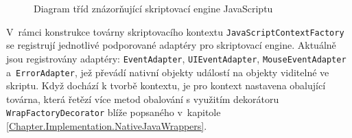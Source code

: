 \begin{figure}[H]
  \begin{center}
    \caption{Diagram tříd znázorňující skriptovací engine JavaScriptu}
    \label{Figure.WindowJavaScriptEngine}
  \end{center}
\end{figure}

\vspace{-1em}

V~rámci konstrukce továrny skriptovacího kontextu \texttt{JavaScriptContextFactory} se registrují jednotlivé podporované adaptéry pro skriptovací engine. Aktuálně jsou registrovány adaptéry: \texttt{EventAdapter}, \texttt{UIEventAdapter}, \texttt{MouseEventAdapter} a~\texttt{ErrorAdapter}, jež převádí nativní objekty událostí na objekty viditelné ve skriptu. Když dochází k tvorbě kontextu, je pro kontext nastavena obalující továrna, která řetězí více metod obalování s využitím dekorátoru \texttt{WrapFactoryDecorator} blíže popsaného v~kapitole \ref{Chapter.Implementation.NativeJavaWrappers}.

